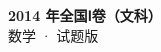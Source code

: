 \documentclass[zihao=-4, a4paper]{ctexart}
\begin{document}
\begin{center}
  {\Large\bfseries 2014 年全国Ⅰ卷（文科）}\\[4pt]
  {\large 数学 · 试题版}
\end{center}
\medskip
{}

\end{document}
